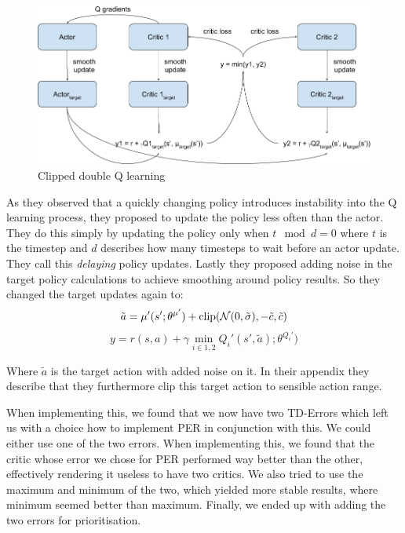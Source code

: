 \documentclass[hyperref,beleg]{cgvpub}
\begin{document}
\begin{figure}
  \centering
  \includegraphics[width=\linewidth]{images/TD3-Setup.png}
  \caption{Clipped double Q learning}
  \label{fig:clippedq}
\end{figure}

As they observed that a quickly changing policy introduces instability into the Q learning process, they proposed to update the policy less often than the actor. They do this simply by updating the policy only when $t\mod d = 0$ where $t$ is the timestep and $d$ describes how many timesteps to wait before an actor update. They call this \textit{delaying} policy updates. Lastly they proposed adding noise in the target policy calculations to achieve smoothing around policy results. So they changed the target updates again to:
\begin{equation}
\tilde{a} = \mu'(s';\theta^{\mu'}) + \text{clip}(\mathcal{N}(0, \tilde{\sigma}), -\tilde{c}, \tilde{c})\\
\end{equation}
\begin{equation}
y = r(s, a) + \gamma \min_{i \in {1,2}} Q_i'(s', \tilde{a});\theta^{Q_i'})
\end{equation}

Where $\tilde{a}$ is the target action with added noise on it. In their appendix they describe that they furthermore clip this target action to sensible action range.

When implementing this, we found that we now have two \ac{TD-Error}s which left us with a choice how to implement \ac{PER} in conjunction with this. We could either use one of the two errors. When implementing this, we found that the critic whose error we chose for \ac{PER} performed way better than the other, effectively rendering it useless to have two critics. We also tried to use the maximum and minimum of the two, which yielded more stable results, where minimum seemed better than maximum. Finally, we ended up with adding the two errors for prioritisation.
\end{document}
